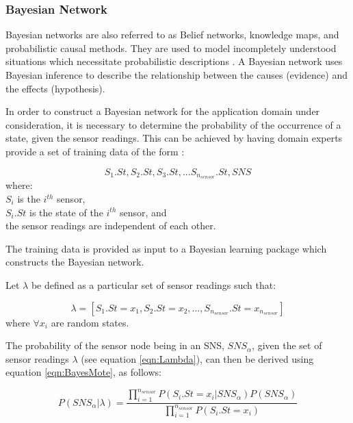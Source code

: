 \documentclass{sig-alternate-10pt}
\begin{document}
\subsubsection{Bayesian Network}

Bayesian networks \cite{ProbReasoningPearl:1998} are also referred to as Belief
networks, knowledge maps, and
probabilistic causal methods. They are used to model incompletely understood 
situations which necessitate probabilistic descriptions
\cite{BayesianCharniak:1991}. A Bayesian network uses Bayesian inference to describe the
relationship between the causes (evidence) and the effects (hypothesis).

In order to construct a Bayesian network for the application domain under
consideration, it is necessary to determine the probability of the occurrence of a
state, given the
sensor readings. This can be achieved by having domain experts provide a set of
training data of the form :

\begin{equation}
S_{1}.St, S_{2}.St, S_{3}.St,...S_{n_{sensor}}.St, SNS 
\end{equation}
\noindent
where:\\
\noindent
$S_{i}$ is the $i^{th}$ sensor,\\
\noindent
$S_{i}.St$ is the state of the $i^{th}$ sensor, and\\
\noindent
the sensor readings are independent of each other. 

The training data is provided as input to a Bayesian learning package which
constructs the Bayesian network. 

Let $\lambda$ be defined as a particular set of sensor readings such that:

\begin{equation} \label{eqn:Lambda}
\lambda = [S_1.St = x_1, S_2.St = x_2, \ldots , S_{n_{sensor}}.St = x_{n_{sensor}}]
\end{equation}
\noindent
where $\forall x_i $ are random states.

The probability of the sensor node being in an SNS, $SNS_{\alpha}$, given the set of sensor readings $\lambda$ (see equation \ref{eqn:Lambda}), can then be derived using equation \ref{eqn:BayesMote}, as follows:

\begin{equation}
P(SNS_{\alpha}|\lambda) = \frac{\prod_{i=1}^{n_{sensor}}P(S_i.St = x_i | SNS_{\alpha}) P(SNS_{\alpha})}{\prod_{i=1}^{n_{sensor}}P(S_i.St = x_i)}
\end{equation}
\end{document}
